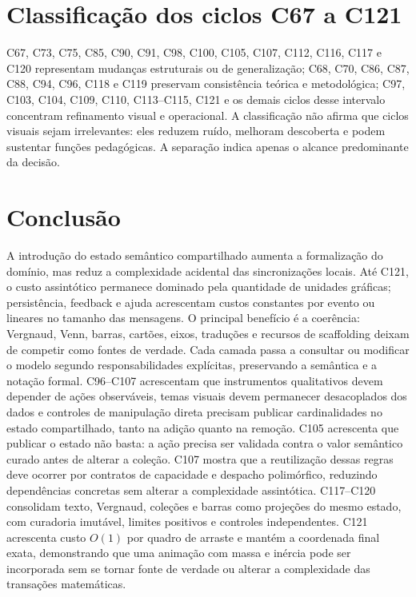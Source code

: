 \documentclass[12pt,a4paper]{article}
\begin{document}
\section{Classificação dos ciclos C67 a C121}

C67, C73, C75, C85, C90, C91, C98, C100, C105, C107, C112, C116, C117 e C120 representam mudanças estruturais ou de generalização; C68, C70, C86, C87, C88, C94, C96, C118 e C119 preservam consistência teórica e metodológica; C97, C103, C104, C109, C110, C113--C115, C121 e os demais ciclos desse intervalo concentram refinamento visual e operacional. A classificação não afirma que ciclos visuais sejam irrelevantes: eles reduzem ruído, melhoram descoberta e podem sustentar funções pedagógicas. A separação indica apenas o alcance predominante da decisão.

\section{Conclusão}

A introdução do estado semântico compartilhado aumenta a formalização do domínio, mas reduz a complexidade acidental das sincronizações locais. Até C121, o custo assintótico permanece dominado pela quantidade de unidades gráficas; persistência, feedback e ajuda acrescentam custos constantes por evento ou lineares no tamanho das mensagens. O principal benefício é a coerência: Vergnaud, Venn, barras, cartões, eixos, traduções e recursos de scaffolding deixam de competir como fontes de verdade. Cada camada passa a consultar ou modificar o modelo segundo responsabilidades explícitas, preservando a semântica e a notação formal. C96--C107 acrescentam que instrumentos qualitativos devem depender de ações observáveis, temas visuais devem permanecer desacoplados dos dados e controles de manipulação direta precisam publicar cardinalidades no estado compartilhado, tanto na adição quanto na remoção. C105 acrescenta que publicar o estado não basta: a ação precisa ser validada contra o valor semântico curado antes de alterar a coleção. C107 mostra que a reutilização dessas regras deve ocorrer por contratos de capacidade e despacho polimórfico, reduzindo dependências concretas sem alterar a complexidade assintótica. C117--C120 consolidam texto, Vergnaud, coleções e barras como projeções do mesmo estado, com curadoria imutável, limites positivos e controles independentes. C121 acrescenta custo $O(1)$ por quadro de arraste e mantém a coordenada final exata, demonstrando que uma animação com massa e inércia pode ser incorporada sem se tornar fonte de verdade ou alterar a complexidade das transações matemáticas.
\end{document}
